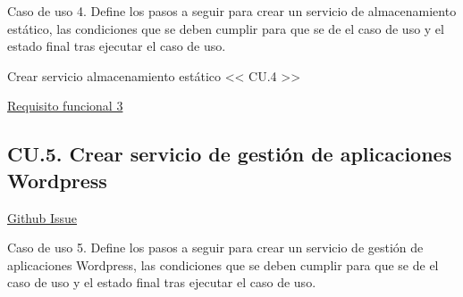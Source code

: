 \begin{text}
	Caso de uso 4. Define los pasos a seguir para crear un servicio de almacenamiento estático, las condiciones que se deben cumplir para que se de el caso de uso y el estado final tras ejecutar el caso de uso.
\end{text}
\begin{usecase}{Crear servicio almacenamiento estático << CU.4 >>}
	
	
	
	
	\hline
\end{usecase}

\hyperref[RF3]{Requisito funcional 3}

\clearpage

\subsection{CU.5. Crear servicio de gestión de aplicaciones Wordpress}

\href{https://github.com/VictorMorenoJimenez/tfg2020/issues/135}{Github Issue}

\begin{text}
	Caso de uso 5. Define los pasos a seguir para crear un servicio de gestión de aplicaciones Wordpress, las condiciones que se deben cumplir para que se de el caso de uso y el estado final tras ejecutar el caso de uso.
\end{text}

